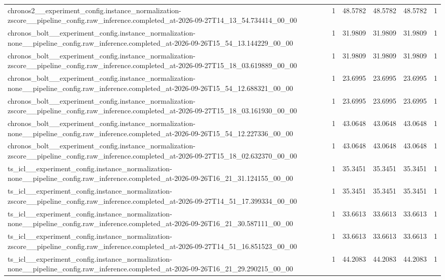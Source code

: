 \begin{tabular}{llllll}
chronos2\_\_experiment\_config.instance\_normalization-zscore\_\_pipeline\_config.raw\_inference.completed\_at-2026-09-27T14\_13\_54.734414\_00\_00 & 1 & 48.5782 & 48.5782 & 48.5782 & 1 \\
chronos\_bolt\_\_experiment\_config.instance\_normalization-none\_\_pipeline\_config.raw\_inference.completed\_at-2026-09-26T15\_54\_13.144229\_00\_00 & 1 & 31.9809 & 31.9809 & 31.9809 & 1 \\
chronos\_bolt\_\_experiment\_config.instance\_normalization-zscore\_\_pipeline\_config.raw\_inference.completed\_at-2026-09-27T15\_18\_03.619889\_00\_00 & 1 & 31.9809 & 31.9809 & 31.9809 & 1 \\
chronos\_bolt\_\_experiment\_config.instance\_normalization-none\_\_pipeline\_config.raw\_inference.completed\_at-2026-09-26T15\_54\_12.688321\_00\_00 & 1 & 23.6995 & 23.6995 & 23.6995 & 1 \\
chronos\_bolt\_\_experiment\_config.instance\_normalization-zscore\_\_pipeline\_config.raw\_inference.completed\_at-2026-09-27T15\_18\_03.161930\_00\_00 & 1 & 23.6995 & 23.6995 & 23.6995 & 1 \\
chronos\_bolt\_\_experiment\_config.instance\_normalization-none\_\_pipeline\_config.raw\_inference.completed\_at-2026-09-26T15\_54\_12.227336\_00\_00 & 1 & 43.0648 & 43.0648 & 43.0648 & 1 \\
chronos\_bolt\_\_experiment\_config.instance\_normalization-zscore\_\_pipeline\_config.raw\_inference.completed\_at-2026-09-27T15\_18\_02.632370\_00\_00 & 1 & 43.0648 & 43.0648 & 43.0648 & 1 \\
ts\_icl\_\_experiment\_config.instance\_normalization-none\_\_pipeline\_config.raw\_inference.completed\_at-2026-09-26T16\_21\_31.124155\_00\_00 & 1 & 35.3451 & 35.3451 & 35.3451 & 1 \\
ts\_icl\_\_experiment\_config.instance\_normalization-zscore\_\_pipeline\_config.raw\_inference.completed\_at-2026-09-27T14\_51\_17.399334\_00\_00 & 1 & 35.3451 & 35.3451 & 35.3451 & 1 \\
ts\_icl\_\_experiment\_config.instance\_normalization-none\_\_pipeline\_config.raw\_inference.completed\_at-2026-09-26T16\_21\_30.587111\_00\_00 & 1 & 33.6613 & 33.6613 & 33.6613 & 1 \\
ts\_icl\_\_experiment\_config.instance\_normalization-zscore\_\_pipeline\_config.raw\_inference.completed\_at-2026-09-27T14\_51\_16.851523\_00\_00 & 1 & 33.6613 & 33.6613 & 33.6613 & 1 \\
ts\_icl\_\_experiment\_config.instance\_normalization-none\_\_pipeline\_config.raw\_inference.completed\_at-2026-09-26T16\_21\_29.290215\_00\_00 & 1 & 44.2083 & 44.2083 & 44.2083 & 1 \\

\end{tabular}
